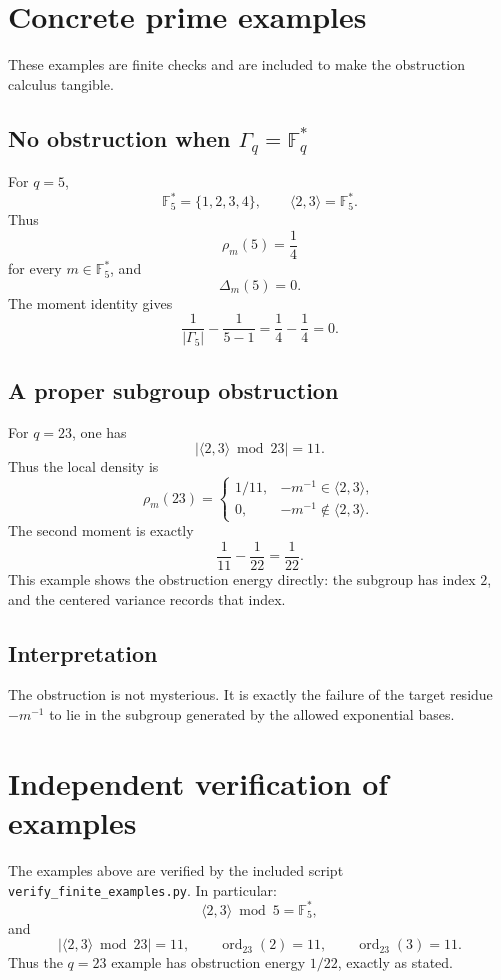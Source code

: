 \documentclass[11pt]{article}
\newcommand{\F}{\mathbb F}
\newcommand{\1}{\mathbf 1}
\newcommand{\ord}{\operatorname{ord}}
\begin{document}
\section{Concrete prime examples}

These examples are finite checks and are included to make the obstruction calculus tangible.

\subsection{No obstruction when \(\Gamma_q=\F_q^*\)}

For \(q=5\),
\[
\F_5^*=\{1,2,3,4\},\qquad \langle2,3\rangle=\F_5^*.
\]
Thus
\[
\rho_m(5)=\frac1{4}
\]
for every \(m\in\F_5^*\), and
\[
\Delta_m(5)=0.
\]
The moment identity gives
\[
\frac1{|\Gamma_5|}-\frac1{5-1}
=
\frac14-\frac14
=
0.
\]

\subsection{A proper subgroup obstruction}

For \(q=23\), one has
\[
|\langle2,3\rangle\bmod23|=11.
\]
Thus the local density is
\[
\rho_m(23)=
\begin{cases}
1/11,& -m^{-1}\in\langle2,3\rangle,\\
0,& -m^{-1}\notin\langle2,3\rangle.
\end{cases}
\]
The second moment is exactly
\[
\frac1{11}-\frac1{22}
=
\frac1{22}.
\]
This example shows the obstruction energy directly: the subgroup has index \(2\), and the centered variance records that index.

\subsection{Interpretation}

The obstruction is not mysterious.  It is exactly the failure of the target residue \(-m^{-1}\) to lie in the subgroup generated by the allowed exponential bases.



\section{Independent verification of examples}

The examples above are verified by the included script \texttt{verify\_finite\_examples.py}. In particular:
\[
\langle2,3\rangle\bmod5=\F_5^*,
\]
and
\[
|\langle2,3\rangle\bmod23|=11,\qquad
\ord_{23}(2)=11,\qquad \ord_{23}(3)=11.
\]
Thus the \(q=23\) example has obstruction energy \(1/22\), exactly as stated.
\end{document}
